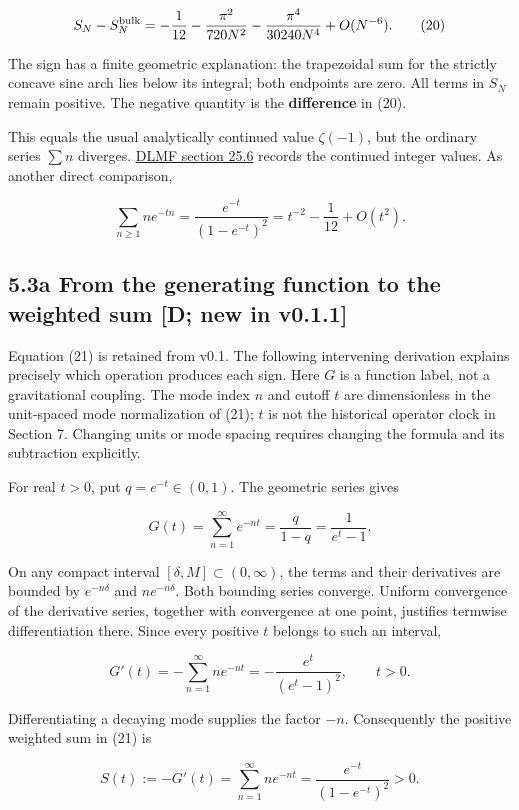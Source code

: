 \documentclass[11pt,a4paper]{article}
\begin{document}
\[
S_N-S_N^{\rm bulk}
=-\frac1{12}-\frac{\pi^2}{720N^2}
-\frac{\pi^4}{30240N^4}+O(N^{-6}). \tag{20}
\]

The sign has a finite geometric explanation: the trapezoidal sum for the strictly concave sine arch lies below its integral; both endpoints are zero. All terms in $S_N$ remain positive. The negative quantity is the \textbf{difference} in (20).


This equals the usual analytically continued value $\zeta(-1)$, but the ordinary series $\sum n$ diverges. \href{https://dlmf.nist.gov/25.6}{DLMF section 25.6} records the continued integer values. As another direct comparison,


\[
\sum_{n\geq1}ne^{-tn}
=\frac{e^{-t}}{(1-e^{-t})^2}
=t^{-2}-\frac1{12}+O(t^2). \tag{21}
\]

\subsection*{5.3a From the generating function to the weighted sum [D; new in v0.1.1]}

Equation (21) is retained from v0.1. The following intervening derivation explains precisely which operation produces each sign. Here $G$ is a function label, not a gravitational coupling. The mode index $n$ and cutoff $t$ are dimensionless in the unit-spaced mode normalization of (21); $t$ is not the historical operator clock in Section 7. Changing units or mode spacing requires changing the formula and its subtraction explicitly.

For real $t>0$, put $q=e^{-t}\in(0,1)$. The geometric series gives

\[
G(t)=\sum_{n=1}^{\infty}e^{-nt}=\frac{q}{1-q}=\frac{1}{e^t-1}. \tag{21a}
\]

On any compact interval $[\delta,M]\subset(0,\infty)$, the terms and their derivatives are bounded by $e^{-n\delta}$ and $ne^{-n\delta}$. Both bounding series converge. Uniform convergence of the derivative series, together with convergence at one point, justifies termwise differentiation there. Since every positive $t$ belongs to such an interval,

\[
G'(t)=-\sum_{n=1}^{\infty}ne^{-nt}=-\frac{e^t}{(e^t-1)^2},\qquad t>0. \tag{21b}
\]

Differentiating a decaying mode supplies the factor $-n$. Consequently the positive weighted sum in (21) is

\[
S(t):=-G'(t)=\sum_{n=1}^{\infty}ne^{-nt}=\frac{e^{-t}}{(1-e^{-t})^2}>0. \tag{21c}
\]
\end{document}
